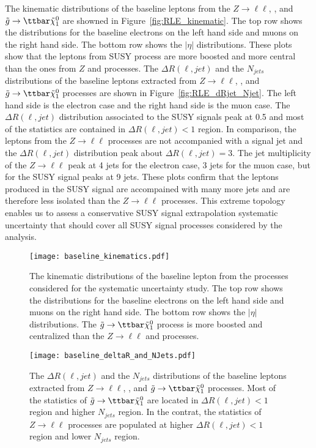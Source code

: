 The kinematic distributions of the baseline leptons from the $Z\to \ell\ell$, \ttbar, and $\tilde{g}\to\ttbar\tilde{\chi}^{0}_{1}$ are showned in Figure~\ref{fig:RLE_kinematic}.
The top row shows the \pt distributions for the baseline electrons on the left hand side and muons on the right hand side.
The bottom row shows the $|\eta|$ distributions.
These plots show that the leptons from SUSY process are more boosted and more central than the ones from $Z$ and \ttbar processes.
The $\Delta R(\ell, jet)$ and the $N_{jets}$ distributions of the baseline leptons extracted from $Z\to\ell\ell$, \ttbar, and $\tilde{g}\to\ttbar\tilde{\chi}^{0}_{1}$ processes are shown in Figure~\ref{fig:RLE_dRjet_Njet}.
The left hand side is the electron case and the right hand side is the muon case.
The $\Delta R(\ell, jet)$ distribution associated to the SUSY signals peak at 0.5 and most of the statistics are contained in $\Delta R(\ell, jet)<1$ region.
In comparison, the leptons from the $Z\to\ell\ell$ processes are not accompanied with a signal jet and the $\Delta R(\ell, jet)$ distribution peak about $\Delta R(\ell, jet)=3$.
The jet multiplicity of the $Z\to\ell\ell$ peak at 4 jets for the electron case, 3 jets for the muon case, but for the SUSY signal peaks at 9 jets.
These plots confirm that the leptons produced in the SUSY signal are accompained with many more jets and are therefore less isolated than the $Z\to\ell\ell$ processes.
This extreme topology enables us to assess a conservative SUSY signal extrapolation systematic uncertainty that should cover all SUSY signal processes considered by the analysis.

\begin{figure}[htbp]
    \texttt{[image: baseline\_kinematics.pdf]}
    \caption{The kinematic distributions of the baseline lepton from the processes considered for the systematic uncertainty study.
    The top row shows the \pt distributions for the baseline electrons on the left hand side and muons on the right hand side.
    The bottom row shows the $|\eta|$ distributions.
    The $\tilde{g}\to\ttbar\tilde{\chi}^{0}_{1}$ process is more boosted and centralized than the $Z\to\ell\ell$ and \ttbar processes.}
    \label{fig:app_RLE_kinematic}
\end{figure}

\begin{figure}[htbp]
    \texttt{[image: baseline\_deltaR\_and\_NJets.pdf]}
    \caption{The $\Delta R(\ell, jet)$ and the $N_{jets}$ distributions of the baseline leptons extracted from $Z\to\ell\ell$, \ttbar, and $\tilde{g}\to\ttbar\tilde{\chi}^{0}_{1}$ processes.
    Most of the statistics of $\tilde{g}\to\ttbar\tilde{\chi}^{0}_{1}$ are located in $\Delta R(\ell, jet)<1$ region and higher $N_{jets}$ region.
    In the contrat, the statistics of $Z\to\ell\ell$ processes are populated at higher $\Delta R(\ell, jet)<1$ region and lower $N_{jets}$ region.}
    \label{fig:app_RLE_dRjet_Njet}
\end{figure}

